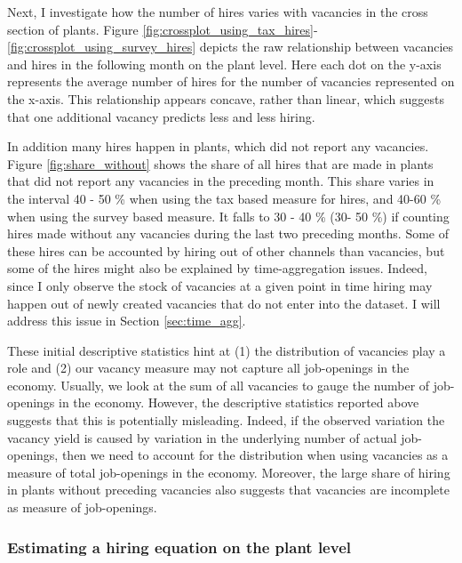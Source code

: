 Next, I investigate how the number of hires varies with vacancies in the cross section of plants. Figure \ref{fig:crossplot_using_tax_hires}-\ref{fig:crossplot_using_survey_hires} depicts the raw relationship between vacancies and hires in the following month on the plant level. Here each dot on the y-axis represents the average number of hires for the number of vacancies represented on the x-axis. This relationship appears concave, rather than linear, which suggests that one additional vacancy predicts less and less hiring. %

In addition many hires happen in plants, which did not report any vacancies. Figure \ref{fig:share_without} shows the share of all hires that are made in plants that did not report any vacancies in the preceding month. This share varies in the interval 40 - 50 \% when using the tax based measure for hires, and 40-60 \% when using the survey based measure. It falls to 30 - 40 \% (30- 50 \%) if counting hires made without any vacancies during the last two preceding months. Some of these hires can be accounted by hiring out of other channels than vacancies, but some of the hires might also be explained by time-aggregation issues. Indeed, since I only observe the stock of vacancies at a given point in time hiring may happen out of newly created vacancies that do not enter into the dataset. I will address this issue in Section \ref{sec:time_agg}.

These initial descriptive statistics hint at (1) the distribution of vacancies play a role and (2) our vacancy measure may not capture all job-openings in the economy. Usually, we look at the sum of all vacancies to gauge the number of job-openings in the economy. However, the descriptive statistics reported above suggests that this is potentially misleading. Indeed, if the observed variation the vacancy yield is caused by variation in the underlying number of actual job-openings, then we need to account for the distribution when using vacancies as a measure of total job-openings in the economy. Moreover, the large share of hiring in plants without preceding vacancies also suggests that vacancies are incomplete as measure of job-openings.

\subsubsection{Estimating a hiring equation on the plant level}

